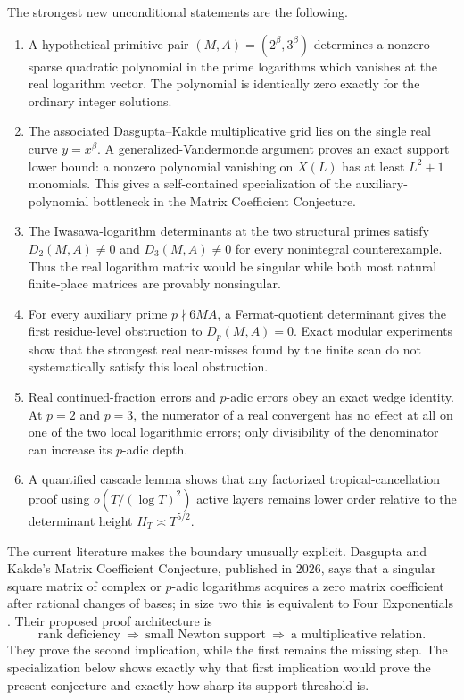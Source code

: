 \documentclass[11pt,oneside]{article}
\theoremstyle{definition}
\theoremstyle{remark}
\begin{document}
The strongest new unconditional statements are the following.
\begin{enumerate}
\item A hypothetical primitive pair $(M,A)=(2^\beta,3^\beta)$ determines a nonzero sparse
      quadratic polynomial in the prime logarithms which vanishes at the real logarithm
      vector.  The polynomial is identically zero exactly for the ordinary integer solutions.
\item The associated Dasgupta--Kakde multiplicative grid lies on the single real curve
      $y=x^\beta$.  A generalized-Vandermonde argument proves an exact support lower bound:
      a nonzero polynomial vanishing on $X(L)$ has at least $L^2+1$ monomials.  This gives a
      self-contained specialization of the auxiliary-polynomial bottleneck in the Matrix
      Coefficient Conjecture.
\item The Iwasawa-logarithm determinants at the two structural primes satisfy
      $D_2(M,A)\ne0$ and $D_3(M,A)\ne0$ for every nonintegral counterexample.  Thus the
      real logarithm matrix would be singular while both most natural finite-place matrices
      are provably nonsingular.
\item For every auxiliary prime $p\nmid6MA$, a Fermat-quotient determinant gives the first
      residue-level obstruction to $D_p(M,A)=0$.  Exact modular experiments show that the
      strongest real near-misses found by the finite scan do not systematically satisfy this
      local obstruction.
\item Real continued-fraction errors and $p$-adic errors obey an exact wedge identity.  At
      $p=2$ and $p=3$, the numerator of a real convergent has no effect at all on one of the
      two local logarithmic errors; only divisibility of the denominator can increase its
      $p$-adic depth.
\item A quantified cascade lemma shows that any factorized tropical-cancellation proof using
      $o(T/(\log T)^2)$ active layers remains lower order relative to the determinant height
      $H_T\asymp T^{5/2}$.
\end{enumerate}

The current literature makes the boundary unusually explicit.  Dasgupta and Kakde's Matrix
Coefficient Conjecture, published in 2026, says that a singular square matrix of complex or
$p$-adic logarithms acquires a zero matrix coefficient after rational changes of bases; in
size two this is equivalent to Four Exponentials \cite{DasguptaKakde2026}.  Their proposed
proof architecture is
\[
   \text{rank deficiency}\ \Longrightarrow\
   \text{small Newton support}\ \Longrightarrow\
   \text{a multiplicative relation}.
\]
They prove the second implication, while the first remains the missing step.  The
specialization below shows exactly why that first implication would prove the present
conjecture and exactly how sharp its support threshold is.
\end{document}
